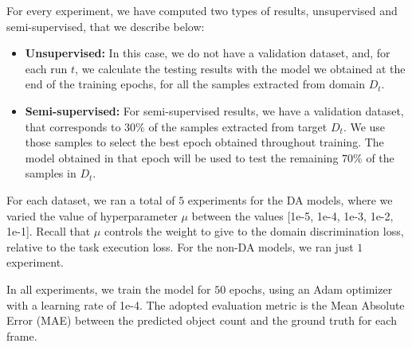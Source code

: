 For every experiment, we have computed two types of results, unsupervised and semi-supervised, that we describe below: 

\begin{itemize}
	\item \textbf{Unsupervised:} In this case, we do not have a validation dataset, and, for each run $t$, we calculate the testing results with the model we obtained at the end of the training epochs, for all the samples extracted from domain $D_t$.
	\item \textbf{Semi-supervised:} For semi-supervised results, we have a validation dataset, that corresponds to $30\%$ of the samples extracted from target $D_t$. We use those samples to select the best epoch obtained throughout training. The model obtained in that epoch will be used to test the remaining $70\%$ of the samples in $D_t$.
\end{itemize}


For each dataset, we ran a total of $5$ experiments for the DA models, where we varied the value of hyperparameter $\mu$ between the values [1e-5, 1e-4, 1e-3, 1e-2, 1e-1]. Recall that $\mu$ controls the weight to give to the domain discrimination loss, relative to the task execution loss. For the non-DA models, we ran just $1$ experiment.

In all experiments, we train the model for $50$ epochs, using an Adam optimizer with a learning rate of 1e-4. The adopted evaluation metric is the Mean Absolute Error (MAE) between the predicted object count and the ground truth for each frame.